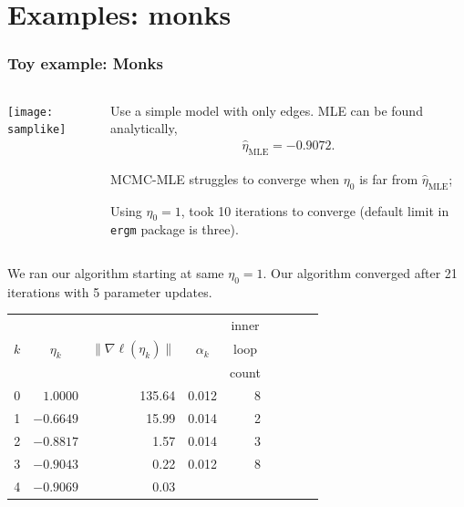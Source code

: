 \documentclass[ 10pt]{beamer}
\newcommand{\etaMLE}{\hat{\eta}_{\textrm{MLE}}}
\begin{document}
\section{Examples: monks}
\frame
{
  \frametitle{Toy example: Monks}  

\begin{columns}[t]
\begin{column}[T]{0.3\textwidth}
\texttt{[image: samplike]}
\end{column}

\begin{column}[r]{0.7\textwidth}
Use a simple model with only edges.  MLE can be 
found analytically,
\begin{align*}
	\etaMLE = -0.9072.
\end{align*}

\pause
MCMC-MLE struggles to converge when
$\eta_0$ is far from $\etaMLE$;

Using $\eta_0 = 1$, took
10 iterations to converge (default limit in \texttt{ergm} package is three).
\end{column}
\end{columns}

\pause
We ran our algorithm starting at same $\eta_0=1$.  Our algorithm converged
after 21 iterations with 5 parameter updates.
{\footnotesize
\begin{table}
\begin{center}
\begin{tabular}{rrrrrrlrr}
  \hline
    &  &  &  & \multicolumn{1}{c}{inner}\\
  \multicolumn{1}{c}{$k$} & 
  \multicolumn{1}{c}{$\eta_k$} &
  \multicolumn{1}{c}{$\lVert \nabla \ell(\eta_k) \rVert$} &
  \multicolumn{1}{c}{$\alpha_k$} &
  \multicolumn{1}{c}{loop }\\
    &  &  &  & \multicolumn{1}{c}{count}\\
  \hline
   0 &  $1.0000$ & 135.64 &  0.012 & 8\\
   1 & $-0.6649$ & 15.99  &  0.014 & 2 \\
   2 & $-0.8817$ & 1.57   &  0.014 & 3 \\
   3 & $-0.9043$ & 0.22   &  0.012 & 8 \\
   4 & $-0.9069$ & 0.03   &  &  \\
   \hline
\end{tabular} \label{T:Sampson redo}
\end{center}
\end{table}}
}
\end{document}
